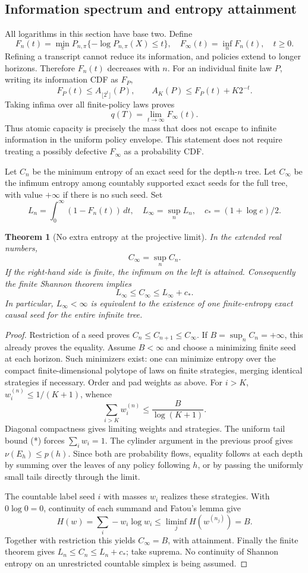 \documentclass[11pt,a4paper]{article}
\newtheorem{theorem}{Theorem}[section]
\theoremstyle{definition}\newtheorem{definition}[theorem]{Definition}
\theoremstyle{remark}\newtheorem{remark}[theorem]{Remark}
\numberwithin{equation}{section}
\begin{document}
\subsection{Information spectrum and entropy attainment}
All logarithms in this section have base two. Define
\[
 F_n(t)=\min_\pi P_{n,\pi}\{-\log P_{n,\pi}(X)\le t\},\quad
 F_\infty(t)=\inf_n F_n(t),\quad t\ge0.
\]
Refining a transcript cannot reduce its information, and policies extend
to longer horizons. Therefore $F_n(t)$ decreases with $n$.
For an individual finite law $P$, writing its information CDF as $F_P$,
\[
 F_P(t)\le A_{\lfloor2^t\rfloor}(P),\qquad
 A_K(P)\le F_P(t)+K2^{-t}.
\]
Taking infima over all finite-policy laws proves
\[
 \boxed{q(T)=\lim_{t\to\infty}F_\infty(t).}
\]
Thus atomic capacity is precisely the mass that does not escape to
infinite information in the uniform policy envelope. This statement
does not require treating a possibly defective $F_\infty$ as a
probability CDF.

Let $C_n$ be the minimum entropy of an exact seed for the depth-$n$
tree. Let $C_\infty$ be the infimum entropy among countably supported
exact seeds for the full tree, with value $+\infty$ if there is no such
seed. Set
\[
 L_n=\int_0^\infty(1-F_n(t))\,dt,\quad
 L_\infty=\sup_nL_n,\quad c_*=(1+\log e)/2.
\]

\begin{theorem}[No extra entropy at the projective limit]
In the extended real numbers,
\[
 \boxed{C_\infty=\sup_n C_n.}
\]
If the right-hand side is finite, the infimum on the left is attained.
Consequently the finite Shannon theorem implies
\[
 L_\infty\le C_\infty\le L_\infty+c_*.
\]
In particular, $L_\infty<\infty$ is equivalent to the existence of one
finite-entropy exact causal seed for the entire infinite tree.
\end{theorem}
\begin{proof}
Restriction of a seed proves $C_n\le C_{n+1}\le C_\infty$. If
$B=\sup_n C_n=+\infty$, this already proves the equality.
Assume $B<\infty$ and choose a minimizing finite seed at each horizon.
Such minimizers exist: one can minimize entropy over the compact
finite-dimensional polytope of laws on finite strategies, merging
identical strategies if necessary. Order and pad weights as above.
For $i>K$, $w_i^{(n)}\le1/(K+1)$, whence
\[
 \sum_{i>K}w_i^{(n)}\le \frac{B}{\log(K+1)}.\tag{*}
\]
Diagonal compactness gives limiting weights and strategies. The uniform
tail bound (*) forces $\sum_iw_i=1$. The cylinder argument in the
previous proof gives $\nu(E_h)\le p(h)$. Since both are probability
flows, equality follows at each depth by summing over the leaves of
any policy following $h$, or by passing the uniformly small tails
directly through the limit.

The countable label seed $i$ with masses $w_i$ realizes these strategies.
With $0\log0=0$, continuity of each summand and Fatou's lemma give
\[
 H(w)=\sum_i-w_i\log w_i
 \le\liminf_j H(w^{(n_j)})=B.
\]
Together with restriction this yields $C_\infty=B$, with attainment.
Finally the finite theorem gives $L_n\le C_n\le L_n+c_*$;
take suprema. No continuity of Shannon entropy on an unrestricted
countable simplex is being assumed.
\end{proof}
\end{document}
